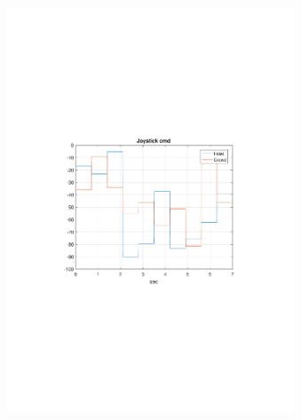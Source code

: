 \documentclass[table]{beamer}
\begin{document}
\begin{frame}[c]
\begin{columns}[c]
\begin{figure}
			\includegraphics[trim=4cm 9cm 4cm 9.5cm, clip=true, width=\linewidth]{img/Example2_Joystick}
		\end{figure}
		\begin{figure}
			\centering

\end{figure}
\end{columns}
\end{frame}
\end{document}
